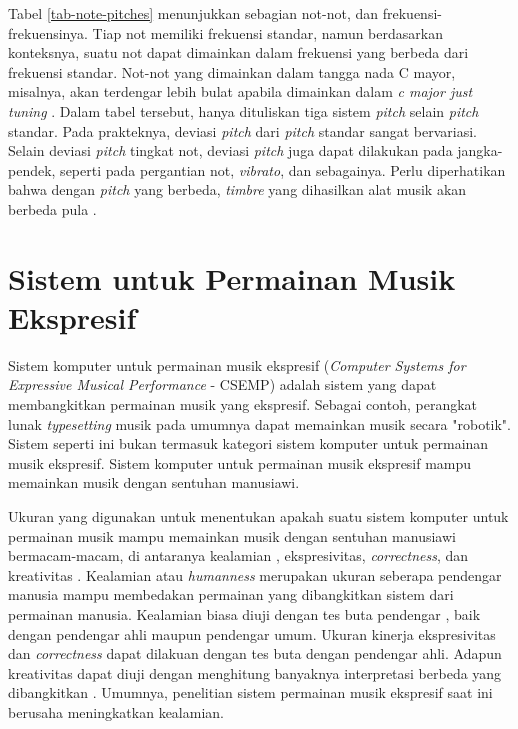 Tabel \ref{tab-note-pitches} menunjukkan sebagian not-not, dan frekuensi-frekuensinya. Tiap not memiliki frekuensi standar, namun berdasarkan konteksnya, suatu not dapat dimainkan dalam frekuensi yang berbeda dari frekuensi standar. Not-not yang dimainkan dalam tangga nada C mayor, misalnya, akan terdengar lebih bulat apabila dimainkan dalam \textit{c major just tuning} \parencite{benward2003music} \parencite{jorgensen1991tuning}. Dalam tabel tersebut, hanya dituliskan tiga sistem \textit{pitch} selain \textit{pitch} standar. Pada prakteknya, deviasi \textit{pitch} dari \textit{pitch} standar sangat bervariasi. Selain deviasi \textit{pitch} tingkat not, deviasi \textit{pitch} juga dapat dilakukan pada jangka-pendek, seperti pada pergantian not, \textit{vibrato}, dan sebagainya. Perlu diperhatikan bahwa dengan \textit{pitch} yang berbeda, \textit{timbre} yang dihasilkan alat musik akan berbeda pula \parencite{setharestuningtimbre}.

\section{Sistem untuk Permainan Musik Ekspresif}

Sistem komputer untuk permainan musik ekspresif (\textit{Computer Systems for Expressive Musical Performance} - CSEMP) adalah sistem yang dapat membangkitkan permainan musik yang ekspresif. Sebagai contoh, perangkat lunak \textit{typesetting} musik pada umumnya dapat memainkan musik secara "robotik". Sistem seperti ini bukan termasuk kategori sistem komputer untuk permainan musik ekspresif. Sistem komputer untuk permainan musik ekspresif mampu memainkan musik dengan sentuhan manusiawi. \parencite{miranda2010}

Ukuran yang digunakan untuk menentukan apakah suatu sistem komputer untuk permainan musik mampu memainkan musik dengan sentuhan manusiawi bermacam-macam, di antaranya kealamian \parencite{schubert2017test}, ekspresivitas, \textit{correctness}, dan kreativitas \parencite{miranda2010}. Kealamian atau \textit{humanness} merupakan ukuran seberapa pendengar manusia mampu membedakan permainan yang dibangkitkan sistem dari permainan manusia. Kealamian biasa diuji dengan tes buta pendengar \parencite{schubert2017test}, baik dengan pendengar ahli maupun pendengar umum. Ukuran kinerja ekspresivitas dan \textit{correctness} dapat dilakuan dengan tes buta dengan pendengar ahli. Adapun kreativitas dapat diuji dengan menghitung banyaknya interpretasi berbeda yang dibangkitkan \parencite{miranda2010}. Umumnya, penelitian sistem permainan musik ekspresif saat ini berusaha meningkatkan kealamian.

